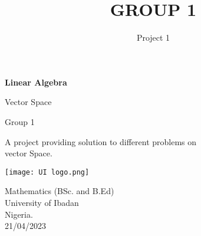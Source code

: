 \documentclass[45pt]{article}
\title{GROUP 1}
\author{Project 1}
\begin{document}
\begin{titlepage}
    \begin{center}
        \vspace*{1cm}
        \Huge
        \textbf{Linear Algebra}
        
        \vspace{0.5cm}
        \LARGE
        Vector Space
        
        \vspace{0.5cm}
        {\fontsize{70}{70}\selectfont Group 1}
        \vspace{0.6cm}        
            
        A project providing solution to  different problems on \\vector Space.
        \vspace{0.8cm}
            
        \texttt{[image: UI logo.png]}

        \vspace{1.0cm}
        
        \Large{
         Mathematics (BSc. and B.Ed)\\
        University of Ibadan\\
        Nigeria.\\
        21/04/2023}
            
    \end{center}
\end{titlepage}
\end{document}

